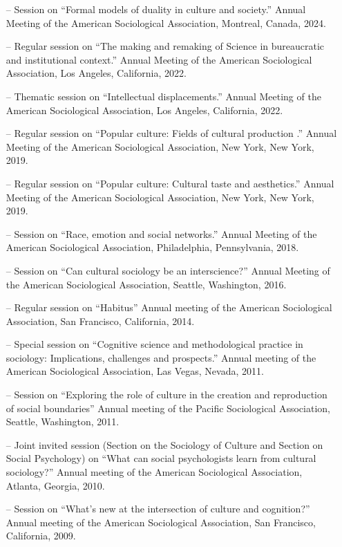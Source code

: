 
\begin{itemize}[itemsep=-0.5ex]
    \item[--] Session on ``Formal models of duality in culture and society.'' Annual Meeting of the American Sociological Association, Montreal, Canada, 2024.
    \item[--] Regular session on ``The making and remaking of Science in bureaucratic and institutional context.'' Annual Meeting of the American Sociological Association, Los Angeles, California, 2022.
    \item[--] Thematic session on ``Intellectual displacements.'' Annual Meeting of the American Sociological Association, Los Angeles, California, 2022.
    \item[--] Regular session on ``Popular culture: Fields of cultural production .'' Annual Meeting of the American Sociological Association, New York, New York, 2019.
    \item[--] Regular session on ``Popular culture: Cultural taste and aesthetics.'' Annual Meeting of the American Sociological Association, New York, New York, 2019.
    \item[--] Session on ``Race, emotion and social networks.'' Annual Meeting of the American Sociological Association, Philadelphia, Pennsylvania, 2018.
    \item[--] Session on  ``Can cultural sociology be an interscience?'' Annual Meeting of the American Sociological Association, Seattle, Washington, 2016.
    \item[--] Regular session on ``Habitus''   Annual meeting of the American Sociological Association, San Francisco, California, 2014.
    \item[--] Special session on ``Cognitive science and methodological practice in sociology: Implications, challenges and prospects.''  Annual meeting of the American Sociological Association, Las Vegas, Nevada, 2011.
    \item[--] Session on ``Exploring the role of culture in the creation and reproduction of social boundaries'' Annual meeting of the Pacific Sociological Association, Seattle, Washington, 2011.
    \item[--] Joint invited session (Section on the Sociology of Culture and Section on Social Psychology) on ``What can social psychologists learn from cultural sociology?''   Annual meeting of the American Sociological Association, Atlanta, Georgia, 2010.
    \item[--] Session on ``What's new at the intersection of culture and cognition?'' Annual meeting of the American Sociological Association, San Francisco, California, 2009.

\end{itemize}
